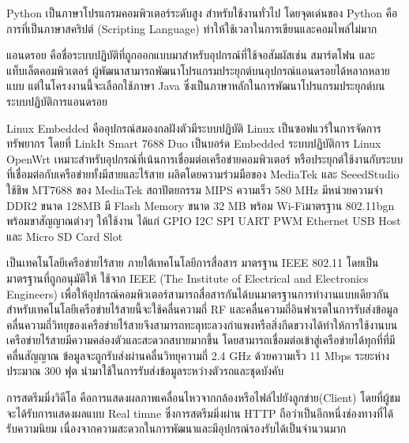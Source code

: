 	Python เป็นภาษาโปรแกรมคอมพิวเตอร์ระดับสูง สำหรับใช้งานทั่วไป
	โดยจุดเด่นของ Python คือการที่เป็นภาษาสคริปต์ (Scripting Language)
	ทำให้ใช้เวลาในการเขียนและคอมไพล์ไม่มาก

    แอนดรอย คือชื่อระบบปฏิบัติที่ถูกออกแบบมาสำหรับอุปกรณ์ที่ใช้จอสัมผัสเช่น สมาร์ตโฟน และแท็บเล็ตคอมพิวเตอร์ ผู้พัฒนาสามารถพัฒนาโปรแกรมประยุกต์บนอุปกรณ์แอนดรอยได้หลากหลายแบบ 
    แต่ในโครงงานนี้จะเลือกใช้ภาษา Java ซึ่งเป็นภาษาหลักในการพัฒนาโปรแกรมประยุกต์บนระบบปฏิบัติการแอนดรอย


    Linux Embedded คืออุปกรณ์สมองกลฝังตัวมีระบบปฏิบัติ Linux เป็นซอฟแวร์ในการจัดการทรัพยากร 
    โดยที่ LinkIt Smart 7688 Duo เป็นบอร์ด Embedded ระบบปฏิบัติการ Linux OpenWrt  เหมาะสำหรับอุปกรณ์ที่เน้นการเชื่อมต่อเครือข่ายคอมพิวเตอร์ 
    หรือประยุกต์ใช้งานกับระบบที่เชื่อมต่อกับเครือข่ายทั้งมีสายและไร้สาย ผลิตโดยความร่วมมือของ MediaTek และ SeeedStudio ใช้ชิพ MT7688 ของ MediaTek 
    สถาปัตยกรรม MIPS ความเร็ว 580 MHz มีหน่วยความจำ DDR2 ขนาด 128MB มี Flash Memory ขนาด 32 MB พร้อม Wi-Fiมาตรฐาน 802.11bgn พร้อมขาสัญญาณต่างๆ 
    ให้ใช้งาน ได้แก่ GPIO I2C SPI UART PWM Ethernet USB Host และ Micro SD Card Slot

    เป็นเทคโนโลยีเครือข่ายไร้สาย  ภายใต้เทคโนโลยีการสื่อสาร มาตรฐาน IEEE  802.11  โดยเป็นมาตรฐานที่ถูกอนุมัติให้ ใช้จาก IEEE (The Institute of Electrical and Electronics Engineers) 
    เพื่อให้อุปกรณ์คอมพิวเตอร์สามารถสื่อสารกันได้บนมาตรฐานการทำงานแบบเดียวกัน  สำหรับเทคโนโลยีเครือข่ายไร้สายนี้จะใช้คลื่นความถี่ RF 
    และคลื่นความถี่อินฟาเรตในการรับส่งข้อมูลคลื่นความถี่วิทยุของเครือข่ายไร้สายจึงสามารถทะลุทะลวงกำแพงหรือสิ่งกีดขวางได้ทำให้การใช้งานบนเครือข่ายไร้สายมีความคล่องตัวและสะดวกสบายมากขึ้น 
    โดยสามารถเชื่อมต่อเข้าสู่เครือข่ายได้ทุกที่ที่มีคลื่นสัญญาณ  ข้อมูลจะถูกรับส่งผ่านคลื่นวิทยุความถี่   2.4 GHz  ด้วยความเร็ว  11 Mbps  ระยะห่างประมาณ  300 ฟุต นำมาใช้ในการรับส่งข้อมูลระหว่างตัวรถและชุดบังคับ
 
    การสตรีมมิ่งวิดีโอ คือการแสดงผลภาพเคลื่อนไหวจากกล้องหรือไฟล์ไปยังลูกข่าย(Client) โดยที่ผู้ชมจะได้รับการแสดงผลแบบ Real timne ซึ่งการสตรีมมิ่งผ่าน HTTP ถือว่าเป็นอีกหนึ่งช่องทางที่ได้รับความนิยม 
    เนื่องจากความสะดวกในการพัฒนาและมีอุปกรณ์รองรับได้เป็นจำนวนมาก

